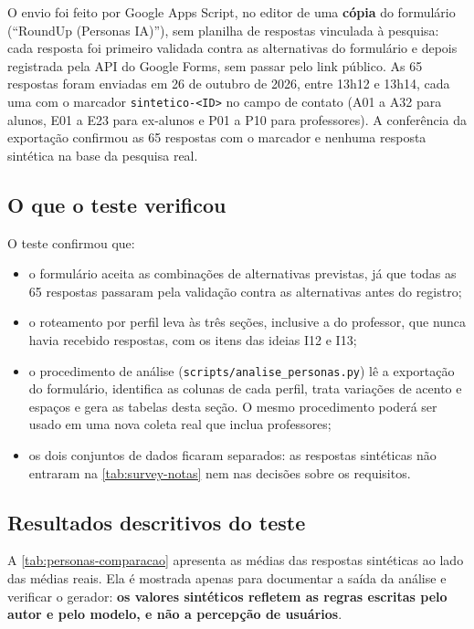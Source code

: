 O envio foi feito por Google Apps Script, no editor de uma
\textbf{cópia} do formulário (``RoundUp (Personas IA)''), sem planilha de
respostas vinculada à pesquisa: cada resposta foi primeiro validada contra
as alternativas do formulário e depois registrada pela API do Google
Forms, sem passar pelo link público. As 65 respostas foram enviadas em 26
de outubro de 2026, entre 13h12 e 13h14, cada uma com o marcador
\texttt{sintetico-<ID>} no campo de contato (A01 a A32 para alunos, E01 a
E23 para ex-alunos e P01 a P10 para professores). A conferência da
exportação confirmou as 65 respostas com o marcador e nenhuma resposta
sintética na base da pesquisa real.

\subsection{O que o teste verificou}

O teste confirmou que:

\begin{itemize}
  \item o formulário aceita as combinações de alternativas previstas, já
        que todas as 65 respostas passaram pela validação contra as
        alternativas antes do registro;
  \item o roteamento por perfil leva às três seções, inclusive a do
        professor, que nunca havia recebido respostas, com os itens das
        ideias I12 e I13;
  \item o procedimento de análise (\texttt{scripts/analise\_personas.py})
        lê a exportação do formulário, identifica as colunas de cada perfil,
        trata variações de acento e espaços e gera as tabelas desta seção.
        O mesmo procedimento poderá ser usado em uma nova coleta real que
        inclua professores;
  \item os dois conjuntos de dados ficaram separados: as respostas
        sintéticas não entraram na \autoref{tab:survey-notas} nem nas
        decisões sobre os requisitos.
\end{itemize}

\subsection{Resultados descritivos do teste}

A \autoref{tab:personas-comparacao} apresenta as médias das respostas
sintéticas ao lado das médias reais. Ela é mostrada apenas para documentar
a saída da análise e verificar o gerador: \textbf{os valores sintéticos
refletem as regras escritas pelo autor e pelo modelo, e não a percepção de
usuários}.

